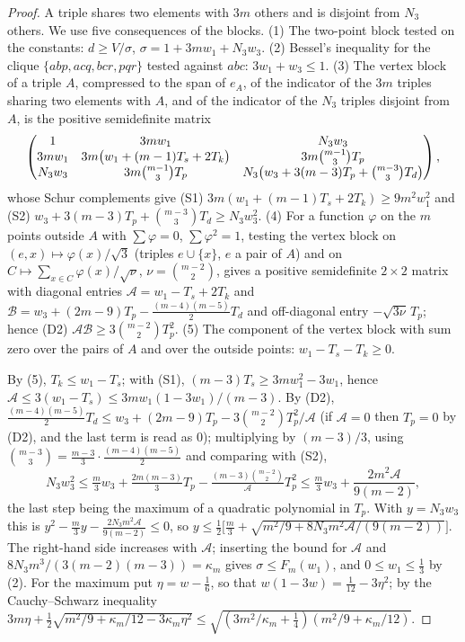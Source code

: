 \documentclass[11pt]{article}
\theoremstyle{remark}
\begin{document}
\begin{proof}
A triple shares two elements with $3m$ others and is disjoint from $N_3$ others. We use five consequences of
the blocks.
(1) The two-point block tested on the constants: $d\ge V/\sigma$, $\sigma=1+3mw_1+N_3w_3$.
(2) Bessel's inequality for the clique $\{abp,acq,bcr,pqr\}$ tested against $abc$: $3w_1+w_3\le1$.
(3) The vertex block of a triple $A$, compressed to the span of $e_A$, of the indicator of the $3m$ triples
sharing two elements with $A$, and of the indicator of the $N_3$ triples disjoint from $A$, is the positive
semidefinite matrix
\[\begin{pmatrix}1&3mw_1&N_3w_3\\ 3mw_1&3m\bigl(w_1+(m-1)T_s+2T_k\bigr)&3m\tbinom{m-1}3T_p\\
N_3w_3&3m\tbinom{m-1}3T_p&N_3\bigl(w_3+3(m-3)T_p+\tbinom{m-3}3T_d\bigr)\end{pmatrix},\]
whose Schur complements give
(S1) $3m(w_1+(m-1)T_s+2T_k)\ge9m^2w_1^2$ and (S2) $w_3+3(m-3)T_p+\binom{m-3}3T_d\ge N_3w_3^2$.
(4) For a function $\varphi$ on the $m$ points outside $A$ with $\sum\varphi=0$, $\sum\varphi^2=1$, testing the
vertex block on $(e,x)\mapsto\varphi(x)/\sqrt3$ (triples $e\cup\{x\}$, $e$ a pair of $A$) and on
$C\mapsto\sum_{x\in C}\varphi(x)/\sqrt{\nu}$, $\nu=\binom{m-2}2$, gives a positive semidefinite $2\times2$ matrix
with diagonal entries $\mathcal A=w_1-T_s+2T_k$ and
$\mathcal B=w_3+(2m-9)T_p-\tfrac{(m-4)(m-5)}2T_d$ and off-diagonal entry $-\sqrt{3\nu}\,T_p$; hence
(D2) $\mathcal A\mathcal B\ge3\binom{m-2}2T_p^2$.
(5) The component of the vertex block with sum zero over the pairs of $A$ and over the outside points:
$w_1-T_s-T_k\ge0$.

By (5), $T_k\le w_1-T_s$; with (S1), $(m-3)T_s\ge3mw_1^2-3w_1$, hence
$\mathcal A\le3(w_1-T_s)\le3mw_1(1-3w_1)/(m-3)$. By (D2),
$\tfrac{(m-4)(m-5)}2T_d\le w_3+(2m-9)T_p-3\binom{m-2}2T_p^2/\mathcal A$ (if $\mathcal A=0$ then $T_p=0$ by
(D2), and the last term is read as $0$); multiplying by $(m-3)/3$, using
$\binom{m-3}3=\tfrac{m-3}3\cdot\tfrac{(m-4)(m-5)}2$ and comparing with (S2),
\[N_3w_3^2\le\tfrac m3w_3+\tfrac{2m(m-3)}3T_p-\tfrac{(m-3)\binom{m-2}2}{\mathcal A}T_p^2
\le\tfrac m3w_3+\frac{2m^2\mathcal A}{9(m-2)},\]
the last step being the maximum of a quadratic polynomial in $T_p$. With $y=N_3w_3$ this is
$y^2-\tfrac m3y-\tfrac{2N_3m^2\mathcal A}{9(m-2)}\le0$, so
$y\le\tfrac12\bigl[\tfrac m3+\sqrt{m^2/9+8N_3m^2\mathcal A/(9(m-2))}\bigr]$. The right-hand side increases
with $\mathcal A$; inserting the bound for
$\mathcal A$ and $8N_3m^3/(3(m-2)(m-3))=\kappa_m$ gives $\sigma\le F_m(w_1)$, and $0\le w_1\le\tfrac13$ by (2).
For the maximum put $\eta=w-\tfrac16$, so that $w(1-3w)=\tfrac1{12}-3\eta^2$; by the Cauchy--Schwarz inequality
$3m\eta+\tfrac12\sqrt{m^2/9+\kappa_m/12-3\kappa_m\eta^2}\le\sqrt{(3m^2/\kappa_m+\tfrac14)(m^2/9+\kappa_m/12)}$.
\end{proof}
\end{document}
